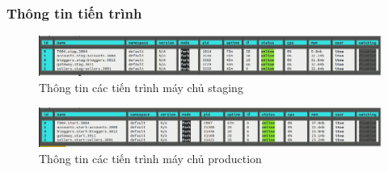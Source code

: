 \subsubsection{Thông tin tiến trình}
\begin{figure}[h!]
	\begin{center}	
		\includegraphics[width=\textwidth]{./results/vps-staging}
		\caption{Thông tin các tiến trình máy chủ staging}
	\end{center}
\end{figure}


\begin{figure}[h!]
	\begin{center}	
		\includegraphics[width=\textwidth]{./results/vps-production}
		\caption{Thông tin các tiến trình máy chủ production}
	\end{center}
\end{figure}
